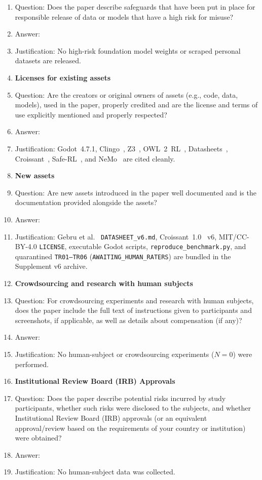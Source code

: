 \documentclass{article}
\begin{document}
\begin{enumerate}
    \item[] Question: Does the paper describe safeguards that have been put in place for responsible release of data or models that have a high risk for misuse?
    \item[] Answer: \answerNA{}
    \item[] Justification: No high-risk foundation model weights or scraped personal datasets are released.
\item {\bf Licenses for existing assets}
    \item[] Question: Are the creators or original owners of assets (e.g., code, data, models), used in the paper, properly credited and are the license and terms of use explicitly mentioned and properly respected?
    \item[] Answer: \answerYes{}
    \item[] Justification: Godot~4.7.1, Clingo~\cite{gebser2019clingo}, Z3~\cite{demoura2008z3}, OWL~2~RL~\cite{motik2012owl2profiles}, Datasheets~\cite{gebru2021datasheets}, Croissant~\cite{akhtar2024croissant}, Safe-RL~\cite{alshiekh2018shield}, and NeMo~\cite{rebedea2023nemo} are cited cleanly.
\item {\bf New assets}
    \item[] Question: Are new assets introduced in the paper well documented and is the documentation provided alongside the assets?
    \item[] Answer: \answerYes{}
    \item[] Justification: Gebru et al.~\cite{gebru2021datasheets} \texttt{DATASHEET\_v6.md}, Croissant~1.0~\cite{akhtar2024croissant} v6, MIT/CC-BY-4.0 \texttt{LICENSE}, executable Godot scripts, \texttt{reproduce\_benchmark.py}, and quarantined \texttt{TR01--TR06} (\texttt{AWAITING\_}\allowbreak\texttt{HUMAN\_}\allowbreak\texttt{RATERS}) are bundled in the Supplement v6 archive.
\item {\bf Crowdsourcing and research with human subjects}
    \item[] Question: For crowdsourcing experiments and research with human subjects, does the paper include the full text of instructions given to participants and screenshots, if applicable, as well as details about compensation (if any)?
    \item[] Answer: \answerNA{}
    \item[] Justification: No human-subject or crowdsourcing experiments ($N{=}0$) were performed.
\item {\bf Institutional Review Board (IRB) Approvals}
    \item[] Question: Does the paper describe potential risks incurred by study participants, whether such risks were disclosed to the subjects, and whether Institutional Review Board (IRB) approvals (or an equivalent approval/review based on the requirements of your country or institution) were obtained?
    \item[] Answer: \answerNA{}
    \item[] Justification: No human-subject data was collected.
\end{enumerate}
\end{document}

